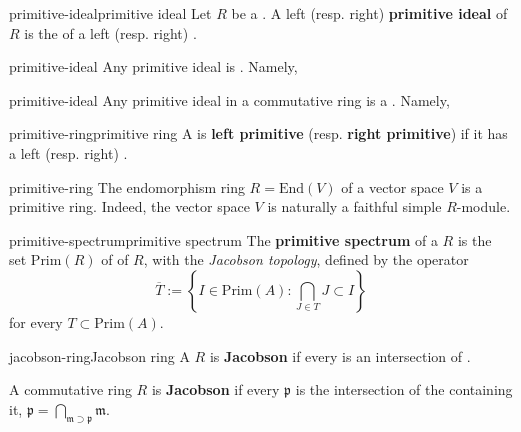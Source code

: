 \begin{topic}{primitive-ideal}{primitive ideal}
    Let $R$ be a . A left (resp. right) \textbf{primitive ideal} of $R$ is the  of a  left (resp. right) .
\end{topic}

\begin{example}{primitive-ideal}
    Any primitive ideal is . Namely, 
\end{example}

\begin{example}{primitive-ideal}
    Any primitive ideal in a commutative ring is a . Namely, 
\end{example}

\begin{topic}{primitive-ring}{primitive ring}
    A  is \textbf{left primitive} (resp. \textbf{right primitive}) if it has a   left (resp. right) .
\end{topic}

\begin{example}{primitive-ring}
    The endomorphism ring $R = \text{End}(V)$ of a vector space $V$ is a primitive ring. Indeed, the vector space $V$ is naturally a faithful simple $R$-module.
\end{example}

\begin{topic}{primitive-spectrum}{primitive spectrum}
    The \textbf{primitive spectrum} of a  $R$ is the set $\text{Prim}(R)$ of  of $R$, with the \textit{Jacobson topology}, defined by the  operator
    \[ \overline{T} := \left\{ I \in \text{Prim}(A) : \bigcap_{J \in T} J \subset I \right\} \]
    for every $T \subset \text{Prim}(A)$.
\end{topic}

\begin{topic}{jacobson-ring}{Jacobson ring}
    A  $R$ is \textbf{Jacobson} if every  is an intersection of .
    
    A commutative ring $R$ is \textbf{Jacobson} if every  $\mathfrak{p}$ is the intersection of the  containing it, $\mathfrak{p} = \bigcap_{\mathfrak{m} \supset \mathfrak{p}} \mathfrak{m}$.
\end{topic}

